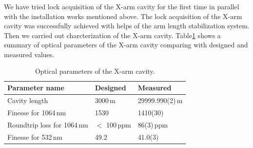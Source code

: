 We have tried lock acquisition of the X-arm cavity for the first time in parallel with the installation works mentioned above. The lock acquisition of the X-arm cavity was successfully achieved with helps of the arm length stabilization system. Then we carried out charcterization of the X-arm cavity. Table\ref{table:xarm} shows a summary of optical parameters of the X-arm cavity comparing with designed and measured values. 

\begin{table} 
\begin{center} 
 \caption{\label{table:xarm}Optical parameters of the X-arm cavity\cite{xarm_com}.}
 \begin{tabular}{lll}
 Parameter name & Designed & Measured \\ \hline
 Cavity length & 3000\,m & 29999.990(2)\,m \\
 Finesse for 1064\,nm & 1530 & 1410(30) \\
Roundtrip loss for 1064\,nm & $<$ 100\,ppm & 86(3)\,ppm \\
Finesse for 532\,nm & 49.2 & 41.0(3) \\ \hline 
\end{tabular}
\end{center} 
 \end{table}






